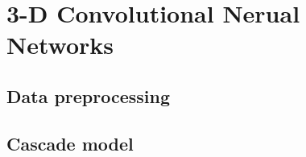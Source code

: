 \chapter{3-D Convolutional Nerual Networks}
\label{4.3D_CNN}

\section{Data preprocessing}

\section{Cascade model}